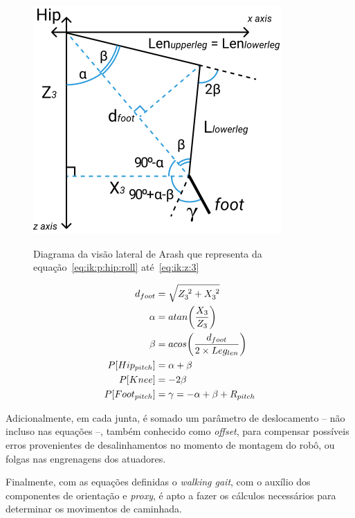 \begin{figure}[htb]
	\centering
	\includegraphics[scale=1.5]{imagens/svg/inverse-kinematics-sideview}
	\caption{Diagrama da visão lateral de Arash que representa da equação~\ref{eq:ik:p:hip:roll} até~\ref{eq:ik:z:3}}
	\caption*{\cite{karimionline}}
	\label{fig:ik:sideview}
\end{figure}

\begin{align}
	       d_{foot} &= \sqrt{Z_3^{\hspace{1mm}2} + X_3^{\hspace{1mm}2}}     \label{eq:ik:d:foot}        \\
	         \alpha &= atan\bigg(\dfrac{X_3}{Z_3}\bigg)                      \label{eq:ik:alpha}         \\
	          \beta &= acos\bigg(\dfrac{d_{foot}}{2 \times Leg_{len}}\bigg)   \label{eq:ik:beta}          \\
	 P[Hip_{pitch}] &= \alpha + \beta                                          \label{eq:ik:p:hip:pitch}   \\
	        P[Knee] &= -2 \beta                                                 \label{eq:ik:p:knee}        \\
	P[Foot_{pitch}] &= \gamma = -\alpha + \beta + R_{pitch}                      \label{eq:ik:p:foot:pitch}
\end{align}

Adicionalmente, em cada junta, é somado um parâmetro de deslocamento -- não incluso nas equações --, também conhecido como \textit{offset}, para compensar possíveis erros provenientes de desalinhamentos no momento de montagem do robô, ou folgas nas engrenagens dos atuadores.

Finalmente, com as equações definidas o \textit{walking gait}, com o auxílio dos componentes de orientação e \textit{proxy}, é apto a fazer os cálculos necessários para determinar os movimentos de caminhada.
